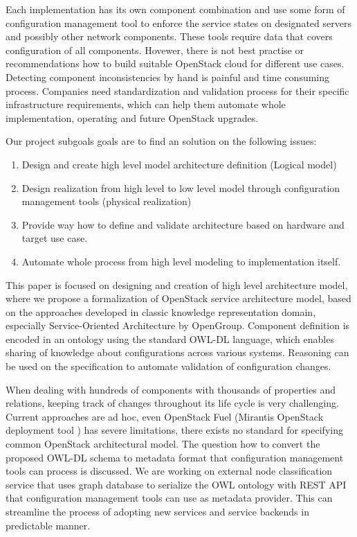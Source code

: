 Each implementation has its own component combination and use some form of configuration management tool to enforce the service states on designated servers and possibly other network components. These tools require data that covers configuration of all components. Hovewer, there is not best practise or recommendations how to build suitable OpenStack cloud for different use cases. Detecting component inconsistencies by hand is painful and time consuming process.
Companies need standardization and validation process for their specific infrastructure requirements, which can help them automate whole implementation, operating and future OpenStack upgrades. 

Our project subgoals goals are to find an solution on the following issues:
\begin{enumerate}
 \item Design and create high level model architecture definition (Logical model)
 \item Design realization from high level to low level model through configuration management tools (physical realization)
 \item Provide way how to define and validate architecture based on hardware and target use case.
 \item Automate whole process from high level modeling to implementation itself.
\end{enumerate}

This paper is focused on designing and creation of high level architecture model, where we propose a formalization of OpenStack service architecture model, based on the approaches developed in classic knowledge representation domain, especially Service-Oriented Architecture by OpenGroup. Component definition is encoded in an ontology using the standard OWL-DL language, which enables sharing of knowledge about configurations across various systems. Reasoning can be used on the specification to automate validation of configuration changes.

When dealing with hundreds of components with thousands of properties and relations, keeping track of changes throughout its life cycle is very challenging. Current approaches are ad hoc, even OpenStack Fuel (Mirantis OpenStack deployment tool \cite{fuel}) has severe limitations, there exists no standard for specifying common OpenStack architectural model. The question how to convert the proposed OWL-DL schema to metadata format that configuration management tools can process is discussed. We are working on external node classification service that uses graph database to serialize the OWL ontology with REST API that configuration management tools can use as metadata provider. This can streamline the process of adopting new services and service backends in predictable manner.

